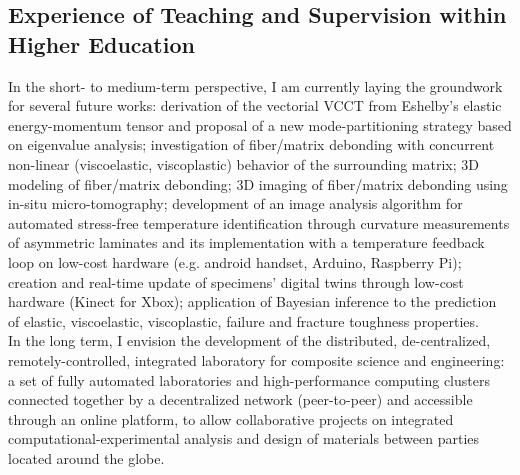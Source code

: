 \documentclass[
  a4paper, 
]{fortysecondscv}
\begin{document}
\subsection{Experience of Teaching and Supervision within Higher Education}
In the short- to medium-term perspective, I am currently laying the groundwork for several future works: derivation of the vectorial VCCT from Eshelby's elastic energy-momentum tensor and proposal of a new mode-partitioning strategy based on eigenvalue analysis; investigation of fiber/matrix debonding with concurrent non-linear (viscoelastic, viscoplastic) behavior of the surrounding matrix; 3D modeling of fiber/matrix debonding; 3D imaging of fiber/matrix debonding using in-situ micro-tomography; development of an image analysis algorithm for automated stress-free temperature identification through curvature measurements of asymmetric laminates and its implementation with a temperature feedback loop on low-cost hardware (e.g. android handset, Arduino, Raspberry Pi); creation and real-time update of specimens' digital twins through low-cost hardware (Kinect for Xbox); application of Bayesian inference to the prediction of elastic, viscoelastic, viscoplastic, failure and fracture toughness properties.\\
In the long term, I envision the development of the distributed, de-centralized, remotely-controlled, integrated laboratory for composite science and engineering: a set of fully automated laboratories and high-performance computing clusters connected together by a decentralized network (peer-to-peer) and accessible through an online platform, to allow collaborative projects on integrated computational-experimental analysis and design of materials between parties located around the globe.
\end{document}
